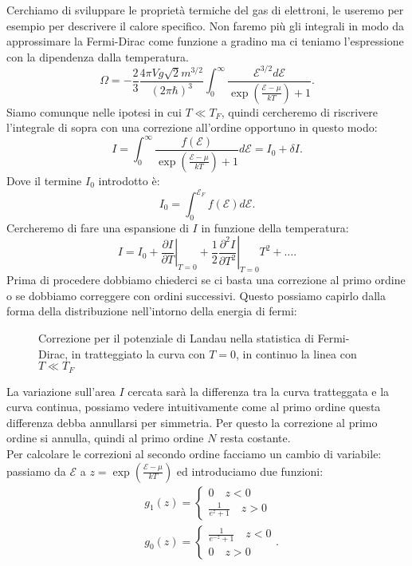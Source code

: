 Cerchiamo di sviluppare le proprietà termiche del gas di elettroni, le useremo per esempio per descrivere il calore specifico. Non faremo più gli integrali in modo da approssimare la Fermi-Dirac come funzione a gradino ma ci teniamo l'espressione con la dipendenza dalla temperatura.
\[
	\Omega = -\frac{2}{3} \frac{4\pi V g \sqrt{2}  m ^{3 /2}  }{\left( 2\pi\hbar  \right) ^3} \int_{0}^{\infty} \frac{\mathcal{E} ^{3 /2}d\mathcal{E} }{\exp\left( \frac{\mathcal{E} -\mu }{kT} \right) +1 } 
.\] 
Siamo comunque nelle ipotesi in cui $T\ll T_{F}$, quindi cercheremo di riscrivere l'integrale di sopra con una correzione all'ordine opportuno in questo modo:
\[
	I = \int_{0}^{\infty} \frac{f( \mathcal{E} ) }{\exp\left( \frac{\mathcal{E} -\mu }{kT} \right) +1 }d\mathcal{E}  = I_0 + \delta  I 
.\] 
Dove il termine $I_0$ introdotto è:
\[
	I_0 = \int_{0}^{\mathcal{E} _{F}} f( \mathcal{E} ) d\mathcal{E} 
.\] 
Cercheremo di fare una espansione di $I$ in funzione della temperatura:
\[
	I = I_0 + \left.\frac{\partial I}{\partial T} \right|_{T =0} + \frac{1}{2}\left.\frac{\partial ^2I}{\partial T^2} \right|_{T = 0} T^2 + \ldots
.\] 
Prima di procedere dobbiamo chiederci se ci basta una correzione al primo ordine o se dobbiamo correggere con ordini successivi. Questo possiamo capirlo dalla forma della distribuzione nell'intorno della energia di fermi:
\begin{figure}[H]
    \centering
    \caption{\scriptsize Correzione per il potenziale di Landau nella statistica di Fermi-Dirac, in tratteggiato la curva con $T=0$, in continuo la linea con $T\ll T_{F}$}
    \label{fig:correzione-per-il-potenziale-di-landau-nella-statistica-di-fermi-dirac}
\end{figure}
\noindent
La variazione sull'area $I$ cercata sarà la differenza tra la curva tratteggata e la curva continua, possiamo vedere intuitivamente come al primo ordine questa differenza debba annullarsi per simmetria. Per questo la correzione al primo ordine si annulla, quindi al primo ordine $N$ resta costante.\\ 
Per calcolare le correzioni al secondo ordine facciamo un cambio di variabile: passiamo da $\mathcal{E} $ a $z = \exp\left( \frac{\mathcal{E} -\mu }{kT} \right) $ ed introduciamo due funzioni: 
 \begin{align*}
	&g_1( z)  = \begin{cases}
		0 \quad z <0\\
		\frac{1}{e^{z}+1} \quad z > 0
	\end{cases}\\
	&g_0( z) =
 \begin{cases}
		\frac{1}{e^{-z}+1} \quad z < 0 \\
		0 \quad z >0
	\end{cases}
.\end{align*}
